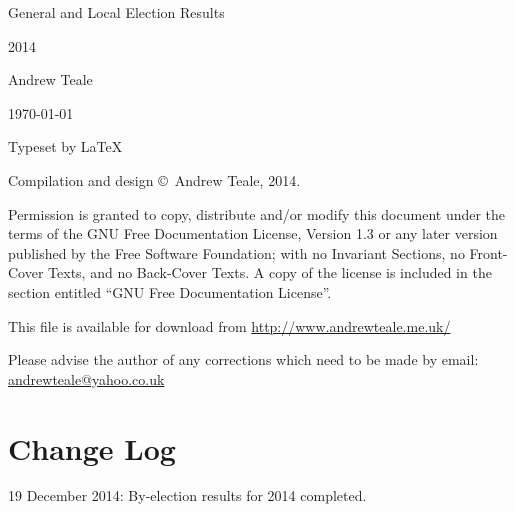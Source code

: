 \documentclass[a4paper,openany]{book}
\begin{document}

\begin{titlepage}

\begin{center}

\Huge General and Local Election Results

2014

\bigskip

\Large Andrew Teale

\vfill

\newcommand\versionno{0.10.1}


\today

\end{center}

\end{titlepage}


\begin{center}

\bigskip

Typeset by \LaTeX{} 

\bigskip

Compilation and design \copyright\ Andrew Teale, 2014.

 Permission is granted to copy, distribute and/or modify this document
 under the terms of the GNU Free Documentation License, Version 1.3
 or any later version published by the Free Software Foundation;
 with no Invariant Sections, no Front-Cover Texts, and no Back-Cover Texts.
 A copy of the license is included in the section entitled ``GNU
 Free Documentation License''.

\bigskip

This file is available for download from
\url{http://www.andrewteale.me.uk/}

\bigskip

Please advise the author of any corrections which need to be made by
email: \url{andrewteale@yahoo.co.uk}

\vfill
\end{center}

\section*{Change Log}

19 December 2014: By-election results for 2014 completed.

\tableofcontents

\end{document}
